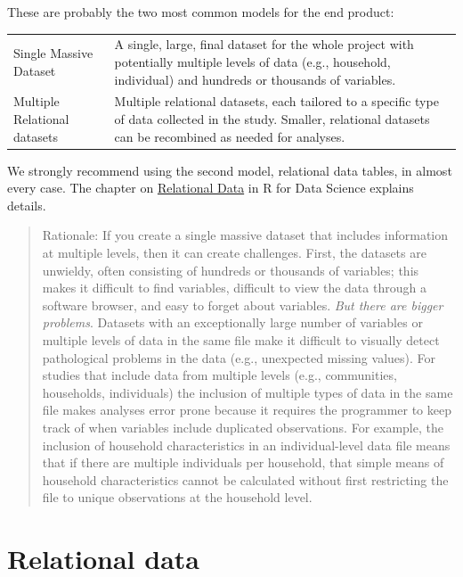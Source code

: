 \documentclass[
]{book}
\begin{document}
These are probably the two most common models for the end product:

\begin{longtable}[]{@{}
  >{\raggedright\arraybackslash}p{}
  >{\raggedright\arraybackslash}p{}@{}}
\toprule\noalign{}
\endhead
\bottomrule\noalign{}
\endlastfoot
Single Massive Dataset & A single, large, final dataset for the whole project with potentially multiple levels of data (e.g., household, individual) and hundreds or thousands of variables. \\
Multiple Relational datasets & Multiple relational datasets, each tailored to a specific type of data collected in the study. Smaller, relational datasets can be recombined as needed for analyses. \\
\end{longtable}

We strongly recommend using the second model, relational data tables, in almost every case. The chapter on \href{https://r4ds.had.co.nz/relational-data.html}{Relational Data} in R for Data Science explains details.

\begin{quote}
Rationale: If you create a single massive dataset that includes information at multiple levels, then it can create challenges. First, the datasets are unwieldy, often consisting of hundreds or thousands of variables; this makes it difficult to find variables, difficult to view the data through a software browser, and easy to forget about variables. \emph{But there are bigger problems}. Datasets with an exceptionally large number of variables or multiple levels of data in the same file make it difficult to visually detect pathological problems in the data (e.g., unexpected missing values). For studies that include data from multiple levels (e.g., communities, households, individuals) the inclusion of multiple types of data in the same file makes analyses error prone because it requires the programmer to keep track of when variables include duplicated observations. For example, the inclusion of household characteristics in an individual-level data file means that if there are multiple individuals per household, that simple means of household characteristics cannot be calculated without first restricting the file to unique observations at the household level.
\end{quote}

\section{Relational data}\label{relational-data}
\end{document}
